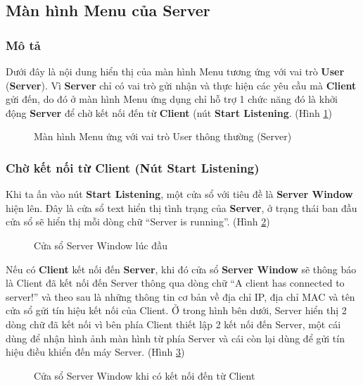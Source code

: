 \subsection{Màn hình Menu của Server}
\subsubsection{Mô tả}
Dưới đây là nội dung hiển thị của màn hình Menu tương ứng với vai trò \textbf{User} (\textbf{Server}). Vì \textbf{Server} chỉ có vai trò gửi nhận và thực hiện các yêu cầu mà \textbf{Client} gửi đến, do đó ở màn hình Menu ứng dụng chỉ hỗ trợ 1 chức năng đó là khởi động \textbf{Server} để chờ kết nối đến từ \textbf{Client} (nút \textbf{Start Listening}. (Hình \ref{fig:ServerMenuWindow})
\begin{figure}[H]
	\caption{Màn hình Menu ứng với vai trò User thông thường (Server)}
	\label{fig:ServerMenuWindow}
\end{figure}

\subsubsection{Chờ kết nối từ Client (Nút Start Listening)}
Khi ta ấn vào nút \textbf{Start Listening}, một cửa sổ với tiêu đề là \textbf{Server Window} hiện lên. Đây là cửa sổ text hiển thị tình trạng của \textbf{Server}, ở trạng thái ban đầu cửa sổ sẽ hiển thị mỗi dòng chữ ``Server is running''. (Hình \ref{fig:ServerLoggerWindow})
\begin{figure}[H]
	\caption{Cửa sổ Server Window lúc đầu}
	\label{fig:ServerLoggerWindow}
\end{figure}

Nếu có \textbf{Client} kết nối đến \textbf{Server}, khi đó cửa sổ \textbf{Server Window} sẽ thông báo là Client đã kết nối đến Server thông qua dòng chữ ``A client has connected to server!'' và theo sau là những thông tin cơ bản về địa chỉ IP, địa chỉ MAC và tên cửa sổ gửi tín hiệu kết nối của Client. Ở trong hình bên dưới, Server hiển thị 2 dòng chữ đã kết nối vì bên phía Client thiết lập 2 kết nối đến Server, một cái dùng để nhận hình ảnh màn hình từ phía Server và cái còn lại dùng để gửi tín hiệu điều khiển đến máy Server. (Hình \ref{fig:ServerWindowConnected})
\begin{figure}[H]
	\caption{Cửa sổ Server Window khi có kết nối đến từ Client}
	\label{fig:ServerWindowConnected}
\end{figure}
